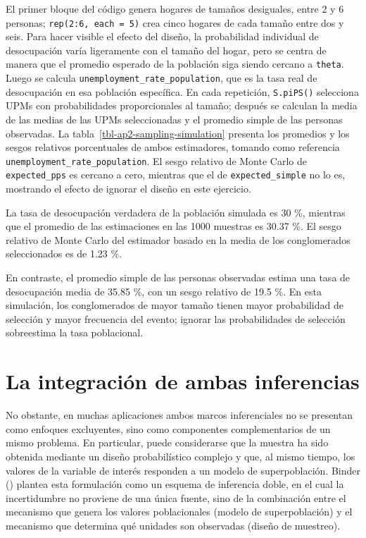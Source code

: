 \documentclass[
  spanish,
  11pt,
  letterpaper,
  oneside,
  open=any]{scrbook}
\begin{document}
El primer bloque del código genera hogares de tamaños desiguales, entre
2 y 6 personas; \texttt{rep(2:6,\ each\ =\ 5)} crea cinco hogares de
cada tamaño entre dos y seis. Para hacer visible el efecto del diseño,
la probabilidad individual de desocupación varía ligeramente con el
tamaño del hogar, pero se centra de manera que el promedio esperado de
la población siga siendo cercano a \texttt{theta}. Luego se calcula
\texttt{unemployment\_rate\_population}, que es la tasa real de
desocupación en esa población específica. En cada repetición,
\texttt{S.piPS()} selecciona UPMs con probabilidades proporcionales al
tamaño; después se calculan la media de las medias de las UPMs
seleccionadas y el promedio simple de las personas observadas. La
tabla~\ref{tbl-ap2-sampling-simulation} presenta los promedios y los
sesgos relativos porcentuales de ambos estimadores, tomando como
referencia \texttt{unemployment\_rate\_population}. El sesgo relativo de
Monte Carlo de \texttt{expected\_pps} es cercano a cero, mientras que el
de \texttt{expected\_simple} no lo es, mostrando el efecto de ignorar el
diseño en este ejercicio.

La tasa de desocupación verdadera de la población simulada es 30 \%,
mientras que el promedio de las estimaciones en las 1000 muestras es
30.37 \%. El sesgo relativo de Monte Carlo del estimador basado en la
media de los conglomerados seleccionados es de 1.23 \%.

En contraste, el promedio simple de las personas observadas estima una
tasa de desocupación media de 35.85 \%, con un sesgo relativo de 19.5
\%. En esta simulación, los conglomerados de mayor tamaño tienen mayor
probabilidad de selección y mayor frecuencia del evento; ignorar las
probabilidades de selección sobreestima la tasa poblacional.

\section{La integración de ambas
inferencias}\label{la-integracion-de-ambas-inferencias}

No obstante, en muchas aplicaciones ambos marcos inferenciales no se
presentan como enfoques excluyentes, sino como componentes
complementarios de un mismo problema. En particular, puede considerarse
que la muestra ha sido obtenida mediante un diseño probabilístico
complejo y que, al mismo tiempo, los valores de la variable de interés
responden a un modelo de superpoblación. Binder
() plantea esta formulación
como un esquema de inferencia doble, en el cual la incertidumbre no
proviene de una única fuente, sino de la combinación entre el mecanismo
que genera los valores poblacionales (modelo de superpoblación) y el
mecanismo que determina qué unidades son observadas (diseño de
muestreo).
\end{document}
